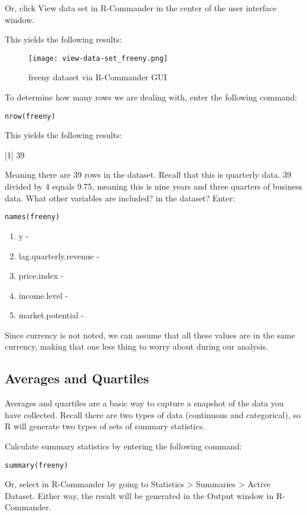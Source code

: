 Or, click View data set in R-Commander in the center of the user interface 
window.

This yields the following results:

\begin{figure}[h!]
\texttt{[image: view-data-set\_freeny.png]}
 \caption{freeny dataset via R-Commander GUI}
 \label{fig:view-data-set_freeny}
\end{figure}

To determine how many rows we are dealing with, enter the following command:

\texttt{nrow(freeny)}

This yields the following results:

[1] 39

Meaning there are 39 rows in the dataset. Recall that this is quarterly data. 
39 divided by 4 equals 9.75, meaning this is nine years and three quarters of 
business data. What other variables are included? in the dataset? Enter: 

\texttt{names(freeny)}

\begin{enumerate}
 \item y - 
 \item lag.quarterly.revenue -  
 \item price.index - 
 \item income.level - 
 \item market.potential - 
\end{enumerate}

Since currency is not noted, we can assume that all these values are in the 
same currency, making that one less thing to worry about during our analysis.

\subsection{Averages and Quartiles}
Averages and quartiles are a basic way to capture a snapshot of the data you 
have collected. Recall there are two types of data (continuous and 
categorical), so R will generate two types of sets of summary statistics.

Calculate summary statistics by entering the following command:

\texttt{summary(freeny)}

Or, select in R-Commander by going to Statistics > Summaries > Active Dataset. 
Either way, the result will be generated in the Output window in R-Commander.

